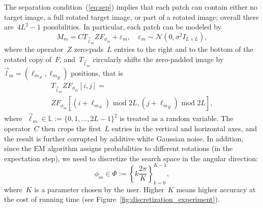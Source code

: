 \documentclass{article}
\begin{document}
The separation condition~(\ref{eq:sep}) implies that each patch can contain either no target image, a full rotated target image, or part of a rotated image; overall there are~$4L^2-1$ possibilities.  In particular, each patch can be modeled by
\begin{equation}
\label{eq:patch}
M_m = C T_{\vec{l}_m} Z F_{\phi_m} + \varepsilon_m, \quad \varepsilon_m \sim \mathcal{N}(0, \sigma^2 I_{L \times L}),
\end{equation}
where the operator~$Z$ \mbox{zero-pads}~$L$ entries to the right and to the bottom of the rotated copy of~$F$, and~$T_{\vec{l}_m}$ circularly shifts the \mbox{zero-padded} image by~$\vec{l}_m = ({\ell_m}_x, {\ell_m}_y)$ positions, that is
\begin{multline}
T_{\vec{l}_m} Z F_{\phi_m} \left[i, j\right] = \\Z F_{\phi_m} \left[(i + {\ell_m}_x) \text{ mod } 2L, (j + {\ell_m}_y) \text{ mod } 2L\right],
\end{multline}
where~$\vec{\ell}_m \in \mathbb{L} := \{0, 1, \ldots, 2L-1\}^2$ is treated as a random variable. The operator~$C$ then crops the first~$L$ entries in the vertical and horizontal axes, and the result is further corrupted by additive white Gaussian noise. In addition, since the EM algorithm assigns probabilities to different rotations (in the expectation step), we need to discretize the search space in the angular direction:
\begin{equation}
\label{eq:Phi_set}
\phi_m \in \Phi := \left\{k \frac{2\pi}{K}\right\}_{k=0}^{K-1},
\end{equation}
where~$K$ is a parameter chosen by the user. Higher~$K$ means higher accuracy at the cost of running time (see Figure~\ref{fig:discretization_experiment}).
\end{document}
